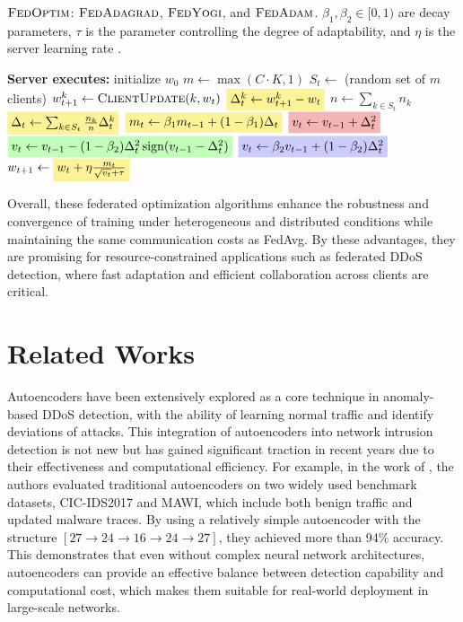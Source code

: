 \begin{algorithm}
  \caption{\colorbox{myyellow}{$\textsc{FedOptim}$}: \colorbox{myred}{$\textsc{FedAdagrad}$}, \colorbox{mygreen}{$\textsc{FedYogi}$}, and \colorbox{myblue}{$\textsc{FedAdam}$}. $\beta_1, \beta_2 \in [0, 1)$ are decay parameters, $\tau$ is the parameter controlling the degree of adaptability, and $\eta$ is the server learning rate \citep{fedoptim}.}
\label{alg:fedoptim}
\begin{algorithmic}[1]
\State \textbf{Server executes:}
\State initialize $w_0$
    \State $m \gets \max(C \cdot K, 1)$
    \State $S_t \gets$ (random set of $m$ clients)
        \State $w^{k}_{t+1} \gets \textsc{ClientUpdate}(k, w_t)$
        \State $\colorbox{myyellow}{$\Delta^{k}_{t} \gets w^{k}_{t+1} - w_t$}$ 
    \EndFor
    \State $n \gets \sum_{k \in S_t} n_k$
    \State $\colorbox{myyellow}{$\Delta_{t} \gets \sum_{k \in S_t} \frac{n_k}{n} \Delta^{k}_{t}$}$
    \State $\colorbox{myyellow}{$m_{t} \gets \beta_1 m_{t-1} + (1 - \beta_1) \Delta_t$}$
    \State $\colorbox{myred}{$v_t \gets v_{t-1} + \Delta_t^2$}$
    \State $\colorbox{mygreen}{$v_t \gets v_{t-1} - (1 - \beta_2) \Delta_t^2 \operatorname{sign}(v_{t-1} - \Delta_t^2)$}$
    \State $\colorbox{myblue}{$v_t \gets \beta_2 v_{t-1} + (1 - \beta_2) \Delta_t^2$}$
    \State $w_{t+1} \gets \colorbox{myyellow}{$w_{t} + \eta \frac{m_t}{\sqrt{v_t} + \tau}$}$
\EndFor
\end{algorithmic}
\end{algorithm}

Overall, these federated optimization algorithms enhance the robustness and convergence of training under heterogeneous and distributed conditions while maintaining the same communication costs as FedAvg. By these advantages, they are promising for resource-constrained applications such as federated DDoS detection, where fast adaptation and efficient collaboration across clients are critical.

\section{Related Works}

Autoencoders have been extensively explored as a core technique in anomaly-based DDoS detection, with the ability of learning normal traffic and identify deviations of attacks. This integration of autoencoders into network intrusion detection is not new but has gained significant traction in recent years due to their effectiveness and computational efficiency. For example,  in the work of \cite{9110372}, the authors evaluated traditional autoencoders on two widely used benchmark datasets, CIC-IDS2017 and MAWI, which include both benign traffic and updated malware traces. By using a relatively simple autoencoder with the structure $[27 \rightarrow 24 \rightarrow 16 \rightarrow 24 \rightarrow 27]$, they achieved more than 94\% accuracy. This demonstrates that even without complex neural network architectures, autoencoders can provide an effective balance between detection capability and computational cost, which makes them suitable for real-world deployment in large-scale networks.

